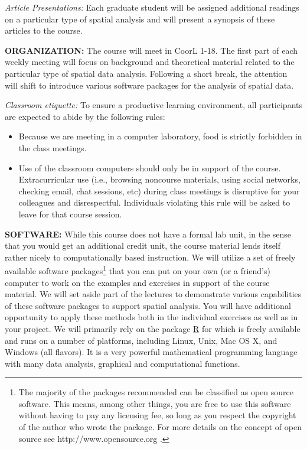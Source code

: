 \documentclass{article} %
\begin{document}
\vspace{.1in}

{\em Article Presentations:} Each graduate student will be assigned additional
readings on a particular type of spatial analysis and will present a synopsis
of these articles to the course.


\vspace{.2in}

{\bf ORGANIZATION:} The course will meet in CoorL 1-18. The first part of each
weekly meeting will focus on background and theoretical material related to
the particular type of spatial data analysis. Following a short break, the
attention will shift to introduce various software packages for the analysis
of spatial data.

\vspace{.1in}

{\em Classroom etiquette:} To ensure a productive learning environment, all
participants are expected to abide by the following rules:
\begin{itemize}
  \item Because we are meeting in a computer laboratory,
food is strictly forbidden in the class meetings.
\item Use of the classroom computers should only be in support of the course.
  Extracurricular use (i.e., browsing noncourse materials, using  social networks, checking
  email, chat sessions, etc) during class meetings is disruptive for your colleagues and
  disrespectful. Individuals violating this rule will be asked to leave for
  that course session.
\end{itemize}

\vspace{.2in}

{\bf SOFTWARE:}
While this course does not have a formal lab unit, in the sense that you would
get an additional credit unit, the course material lends itself rather nicely
to computationally based instruction. We will utilize a set of freely available
software packages\footnote{%
The majority of the packages recommended can be classified as open source software.
This means, among other things, you are free to use this software without having
to pay any licensing fee, so long as you respect the copyright of the author
who wrote the package. For more details on the concept of open source
see http://www.opensource.org .} that you can put on your own (or a
friend's) computer to work on the examples and exercises in support of
the course material. We will set aside part of the lectures to
demonstrate various capabilities of these software packages to support
spatial analysis. You will have additional opportunity to apply these methods
both in the individual exercises as well as in your  project.
We will primarily rely on  the  package   \href{http://www.r-project.org/}{R} for 
which is freely available and runs on a number of platforms, including
Linux, Unix, Mac OS X, and Windows (all flavors). It is a very powerful
mathematical programming language with many data analysis, graphical and
computational functions.
\end{document}
